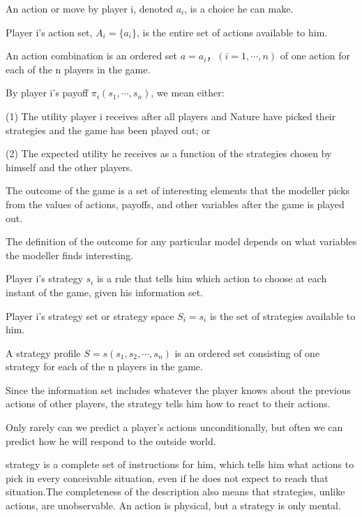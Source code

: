 \documentclass{article}
\begin{document}
\hspace*{\fill}

An action or move by player i, denoted $ a_i $, is a choice he can make.

Player i’s action set, $ A_i=\{a_i\} $, is the entire set of actions available to him.


An action combination is an ordered set $ a={a_i}，(i=1,\cdots,n) $ of one action for each
of the n players in the game.

\hspace*{\fill}

By player i’s payoff $ \pi_i(s_1,\cdots,s_n) $, we mean either:

(1) The utility player i receives after all players and Nature have picked their strategies and
the game has been played out; or

(2) The expected utility he receives as a function of the strategies chosen by himself and the
other players.

\hspace*{\fill}

The outcome of the game is a set of interesting elements that the modeller picks from the
values of actions, payoffs, and other variables after the game is played out.

The definition of the outcome for any particular model depends on what variables
the modeller finds interesting.

\hspace*{\fill}

Player i’s strategy $ s_i $ is a rule that tells him which action to choose at each instant of the
game, given his information set.

Player i’s strategy set or strategy space $ S_i={s_i} $
is the set of strategies available to him.


A strategy profile $ S=s(s_1,s_2,\cdots,s_n) $ is an ordered set consisting of one strategy for each of
the n players in the game.



Since the information set includes whatever the player knows about the previous actions
of other players, the strategy tells him how to react to their actions.

Only rarely can we predict
a player’s actions unconditionally, but often we can predict how he will respond to the
outside world.

strategy is a complete set of instructions for him, which
tells him what actions to pick in every conceivable situation, even if he does not expect to
reach that situation.The
completeness of the description also means that strategies, unlike actions, are unobservable.
An action is physical, but a strategy is only mental.
\end{document}
